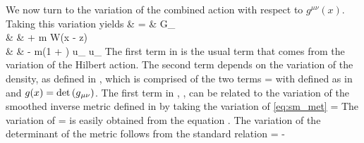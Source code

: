 We now turn to the variation of the combined action with respect
to $g^{\mu\nu}(x)$. Taking this variation yields
\bea\label{eq:var_I_g}
  & = &
     G_{\mu\nu}  \,\,
   \var{\imet{\gm}{\gn}} \nonumber \\
& &
 +  m  \vwrt{\gr}{\imet{\gm}{\gn}}
      W(\vec x - \vec z) \nonumber \\
& &
 -  m(1 + \erg) u_{\mu} u_{\nu} \var{\imet{\gm}{\gn}} \eqp
\eea The first term in  is the usual term that
comes from the variation of the Hilbert action.  The second term
depends on the variation of the density, as defined in
, which is comprised of the two terms
\be\label{eq:var_rho} \vwrt{\gr}{\imet{\gm}{\gn}} =  
\ee with \gL defined as in  and $g(x) =
\det{\ensuremath{\left( { {g}{{}_{\mu \nu} } } \right)} }$. The first term in ,
\var{\smet{\gm\gn}}, can be related to the variation of the
smoothed inverse metric defined in  by taking
the variation of \ref{eq:sm_met} \bes
  \var{\smet{\gs\gt}} = \smet{\gs\ga} \var{\simet{\ga\gb}} \smet{\gb\gt} \eqp
\ees The variation of \simet{\ga\gb} \bes
  \var{\simet{\ga\gb}} =   \var{\imet{\ga}{\gb}}
\ees is easily obtained from the equation .
The variation of the determinant of the metric follows from the
standard relation \bes
  \var{\metd} = - \metd \met{\gm}{\gn} \var{\imet{\gm}{\gn}} \eqp
\ees


